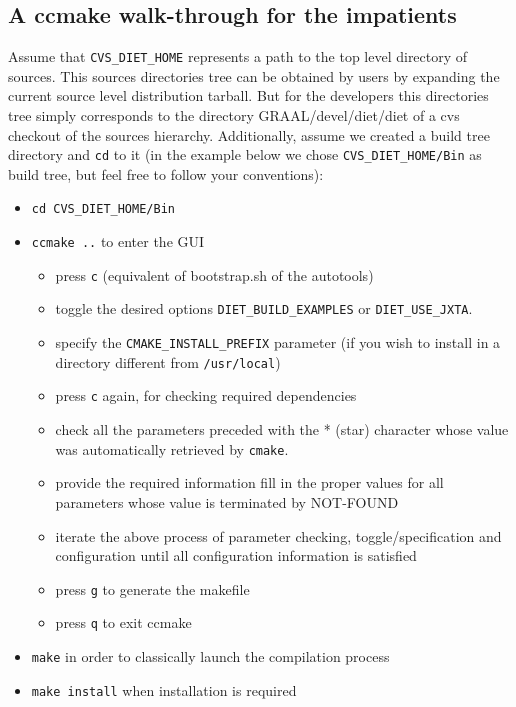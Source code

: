 \subsection{A ccmake walk-through for the impatients}

Assume that \verb+CVS_DIET_HOME+ represents a path to the top level directory
of \diet sources.  This \diet sources directories tree can be obtained by \diet
users by expanding the \diet current source level distribution tarball. But for
the \diet developers this directories tree simply corresponds to the directory
GRAAL/devel/diet/diet of a cvs checkout of the \diet sources hierarchy.
Additionally, assume we created a build tree directory and \verb+cd+ to it (in
the example below we chose \verb+CVS_DIET_HOME/Bin+ as build tree, but feel
free to follow your conventions):
\begin{itemize}
\item
  \verb+cd CVS_DIET_HOME/Bin+
\item
  \verb+ccmake ..+ to enter the GUI
  \begin{itemize}
  \item press \verb+c+ (equivalent of bootstrap.sh of the autotools)
  \item toggle the desired options \eg \verb+DIET_BUILD_EXAMPLES+ or
    \verb+DIET_USE_JXTA+. 
  \item specify the \verb+CMAKE_INSTALL_PREFIX+ parameter (if you wish to
    install in a directory different from \verb+/usr/local+)
  \item press \verb+c+ again, for checking required dependencies
  \item check all the parameters preceded with the * (star) character
    whose value was automatically retrieved by \verb+cmake+.
  \item provide the required information \ie fill in the proper values for all
    parameters whose value is terminated by NOT-FOUND
  \item iterate the above process of parameter checking, toggle/specification
    and configuration until all configuration information is satisfied
  \item press \verb+g+ to generate the makefile
  \item press \verb+q+ to exit ccmake
  \end{itemize}
\item
  \verb+make+ in order to classically launch the compilation process
\item
  \verb+make install+ when installation is required
\end{itemize}


